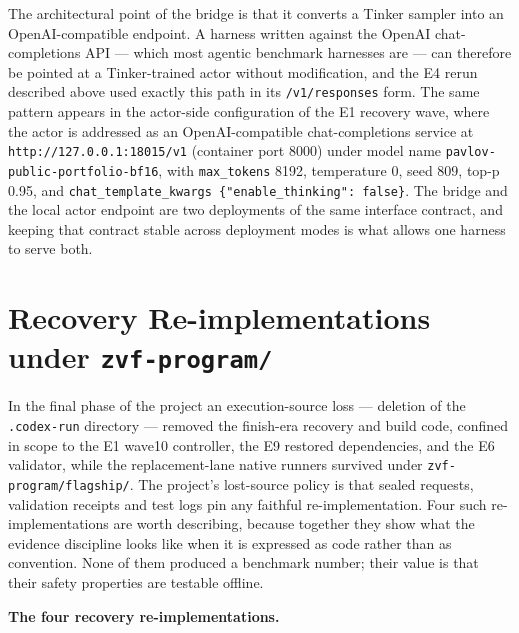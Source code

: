 \documentclass[12pt,a4paper]{report}
\begin{document}
The architectural point of the bridge is that it converts a Tinker
sampler into an OpenAI-compatible endpoint. A harness written against
the OpenAI chat-completions API --- which most agentic benchmark
harnesses are --- can therefore be pointed at a Tinker-trained actor
without modification, and the E4 rerun described above used exactly this
path in its \texttt{/v1/responses} form. The same pattern appears in the
actor-side configuration of the E1 recovery wave, where the actor is
addressed as an OpenAI-compatible chat-completions service at
\texttt{http://127.0.0.1:18015/v1} (container port 8000) under model
name \texttt{pavlov-public-portfolio-bf16}, with \texttt{max\_tokens}
8192, temperature 0, seed 809, top-p 0.95, and
\texttt{chat\_\allowbreak{}\allowbreak{}template\_\allowbreak{}\allowbreak{}kwargs\ \{"\allowbreak{}enable\_\allowbreak{}thinking"\allowbreak{}:\allowbreak{}\ false\}}. The
bridge and the local actor endpoint are two deployments of the same
interface contract, and keeping that contract stable across deployment
modes is what allows one harness to serve both.

\section{\texorpdfstring{Recovery Re-implementations under
\texttt{zvf-program/}}{Recovery Re-implementations under zvf-program/}}\label{recovery-re-implementations-under-zvf-program}

In the final phase of the project an execution-source loss --- deletion
of the \texttt{.codex-run} directory --- removed the finish-era recovery
and build code, confined in scope to the E1 wave10 controller, the E9
restored dependencies, and the E6 validator, while the replacement-lane
native runners survived under \texttt{zvf-program/flagship/}. The
project's lost-source policy is that sealed requests, validation
receipts and test logs pin any faithful re-implementation. Four such
re-implementations are worth describing, because together they show what
the evidence discipline looks like when it is expressed as code rather
than as convention. None of them produced a benchmark number; their
value is that their safety properties are testable offline.

\textbf{The four recovery re-implementations.}
\end{document}
